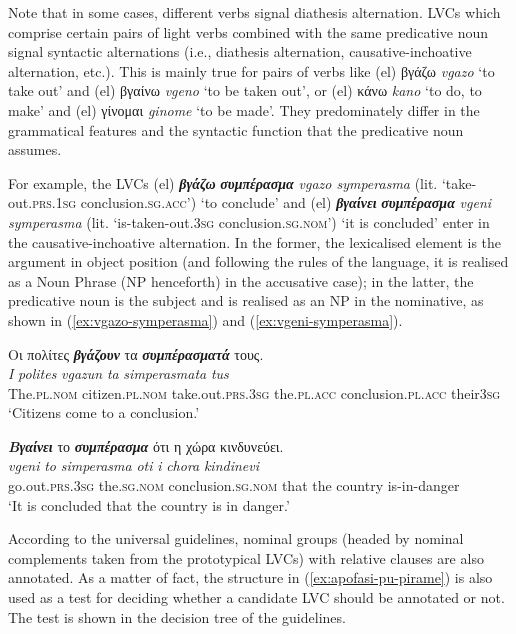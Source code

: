 \documentclass[output=paper,colorlinks,citecolor=brown]{langscibook}
\begin{document}
Note that in some cases, different verbs signal diathesis alternation. LVCs which comprise certain pairs of light verbs combined with the same predicative noun signal syntactic alternations (i.e., diathesis alternation, causative-inchoative alternation, etc.). This is mainly true for pairs of verbs like (el) βγάζω \textit{vgazo} ‘to take out’ and (el) βγαίνω \textit{vgeno} ‘to be taken out’, or (el) κάνω \textit{kano} `to do, to make' and (el) γίνομαι \textit{ginome} `to be made'.
They predominately differ in the grammatical features and the syntactic function that the predicative noun assumes. 


For example, the LVCs (el) \textbf{\em{βγάζω}} \textbf{\em{συμπέρασμα}} \textit{vgazo symperasma} (lit. ‘take-out.\textsc{prs.1sg} conclusion.\textsc{sg.acc}') ‘to conclude' and (el) \textbf{\em{βγαίνει}} \textbf{\em{συμπέρασμα}} \textit{vgeni symperasma} (lit. ‘is-taken-out.\textsc{3sg}   conclusion.\textsc{sg.nom}') ‘it is concluded' enter in the causative-inchoative alternation. In the former, the lexicalised element is the argument in object position (and following the rules of the language, it is realised as a Noun Phrase (NP henceforth) in the accusative case); in the latter, the predicative noun is the subject and is realised as an NP in the nominative, as shown in (\ref{ex:vgazo-symperasma}) and (\ref{ex:vgeni-symperasma}).

\ea
\label{ex:vgazo-symperasma}
\settowidth {}
\glll
Οι πολίτες \textbf{\em{βγάζουν}} τα \textbf{\em{συμπέρασματά}} τους. \\
\textit{I} \textit{polites} \textit{vgazun} \textit{ta}	\textit{simperasmata} \textit{tus}\\
The.\textsc{pl.nom} citizen.\textsc{pl.nom} take.out.\textsc{prs.3sg} the.\textsc{pl.acc} conclusion.\textsc{pl.acc} their\textsc{3sg}\\
\glt ‘Citizens come to a conclusion.’
\z


\ea
\label{ex:vgeni-symperasma}
\settowidth {}
\glll
\textbf{\em{Βγαίνει}} το \textbf{\em{συμπέρασμα}} ότι η χώρα κινδυνεύει. \\
\textit{vgeni} \textit{to} \textit{simperasma} \textit{oti} \textit{i} \textit{chora} \textit{kindinevi}\\
go.out.\textsc{prs.3sg} the.\textsc{sg.nom} conclusion.\textsc{sg.nom} that the country is-in-danger\\
\glt ‘It is concluded that the country is in danger.’
\z


According to the universal guidelines, nominal groups (headed by nominal complements taken from the prototypical LVCs) with relative clauses are also annotated. As a matter of fact, the structure in (\ref{ex:apofasi-pu-pirame}) is also used as a test for deciding whether a candidate LVC should be annotated or not. The test is shown in the decision tree of the guidelines.
\end{document}
